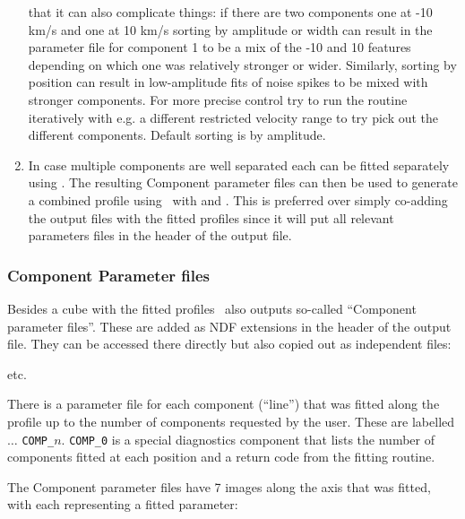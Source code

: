 \documentclass[oneside,11pt]{starlink}
\begin{document}
\begin{enumerate}
  that it can also complicate things: if there are two components one
  at -10 km/s and one at 10 km/s sorting by amplitude or width can
  result in the parameter file for component 1 to be a mix of the -10
  and 10 features depending on which one was relatively stronger or
  wider. Similarly, sorting by position can result in low-amplitude
  fits of noise spikes to be mixed with stronger components. For more
  precise control try to run the routine iteratively with e.g. a
  different restricted velocity range to try pick out the different
  components. Default sorting is by amplitude.
\item In case multiple components are well separated each can be fitted
separately using . The resulting Component parameter files
can then be used to generate a combined profile using \fitdd\ with
 and . This is preferred over
simply co-adding the output files with the fitted profiles since it
will put all relevant parameters files in the header of the output
file.
\end{enumerate}

\subsubsection{Component Parameter files}

Besides a cube with the fitted profiles \fitdd\ also outputs so-called
``Component parameter files''. These are added as NDF extensions in
the header of the output file. They can be accessed there directly but
also copied out as independent files:

\begin{terminalv}
etc.
\end{terminalv}

There is a parameter file for each component (``line'') that was
fitted along the profile up to the number of components requested by
the user. These are labelled  $\ldots$
\texttt{COMP\_$n$}. \texttt{COMP\_0} is a special diagnostics
component that lists the number of components fitted at each position
and a return code from the fitting routine.

The Component parameter files have 7 images along the axis that was
fitted, with each representing a fitted parameter:
\end{document}
